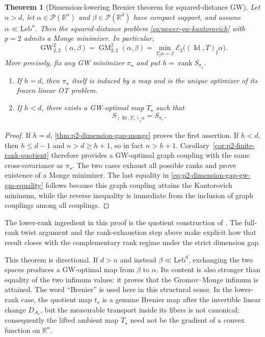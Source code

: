 \documentclass[11pt,a4paper]{article}
\newtheorem{theorem}{Theorem}[section]
\theoremstyle{definition}
\theoremstyle{remark}
\newcommand{\R}{\mathbb R}
\newcommand{\Pcal}{\mathcal P}
\newcommand{\Ecal}{\mathcal E}
\newcommand{\Id}{\operatorname{Id}}
\newcommand{\rank}{\operatorname{rank}}
\newcommand{\GW}{\operatorname{GW}}
\newcommand{\GM}{\operatorname{GM}}
\begin{document}
\begin{theorem}[Dimension-lowering Brenier theorem for squared-distance GW]
\label{thm:p2-strict-dimension-gap-monge}
Let \(n>d\), let \(\alpha\in\Pcal(\R^n)\) and
\(\beta\in\Pcal(\R^d)\) have compact support, and assume
\(\alpha\ll\mathrm{Leb}^n\).  Then the squared-distance problem
\eqref{eq:power-gw-kantorovich} with \(p=2\) admits a Monge minimizer.  In
particular,
\begin{equation}
  \GW_{2,2}^2(\alpha,\beta)
  =\GM_{2,2}^2(\alpha,\beta)
  =\min_{T_\sharp\alpha=\beta}
    \Ecal_2\bigl((\Id,T)_\sharp\alpha\bigr).
  \label{eq:p2-dimension-gap-gw-gm-equality}
\end{equation}
More precisely, fix any GW minimizer \(\pi_\star\) and put
\(h=\rank S_{\pi_\star}\).
\begin{enumerate}[label=(\roman*)]
  \item If \(h=d\), then \(\pi_\star\) itself is induced by a map and is the
  unique optimizer of its frozen linear OT problem.
  \item If \(h<d\), there exists a GW-optimal map \(T_\star\) such that
  \begin{equation}
    S_{(\Id,T_\star)_\sharp\alpha}=S_{\pi_\star}.
    \label{eq:p2-dimension-gap-preserved-cross-covariance}
  \end{equation}
\end{enumerate}
\end{theorem}

\begin{proof}
If \(h=d\), \cref{thm:p2-dimension-gap-monge} proves the first assertion.
If \(h<d\), then \(h\leq d-1\) and \(n>d\geq h+1\), so in fact
\(n>h+1\).  Corollary~\ref{cor:p2-finite-rank-quotient} therefore provides a
GW-optimal graph coupling with the same cross-covariance as \(\pi_\star\).
The two cases exhaust all possible ranks and prove existence of a Monge
minimizer.  The last equality in
\eqref{eq:p2-dimension-gap-gw-gm-equality} follows because this graph coupling
attains the Kantorovich minimum, while the reverse inequality is immediate
from the inclusion of graph couplings among all couplings.
\end{proof}

The lower-rank ingredient in this proof is the quotient construction of
\citet{DumontLacombeVialard2025}.  The full-rank twist argument and the
rank-exhaustion step above make explicit how that result closes with the
complementary rank regime under the strict dimension gap.

This theorem is directional.  If \(d>n\) and instead
\(\beta\ll\mathrm{Leb}^d\), exchanging the two spaces produces a GW-optimal
map from \(\beta\) to \(\alpha\).  Its content is also stronger than equality
of the two infimum values: it proves that the Gromov--Monge infimum is
attained.  The word ``Brenier'' is used here in this structural sense.  In the
lower-rank case, the quotient map \(t_\star\) is a genuine Brenier map after
the invertible linear change \(D_{A_\star}\), but the measurable transport
inside its fibers is not canonical; consequently the lifted ambient map
\(T_\star\) need not be the gradient of a convex function on \(\R^n\).
\end{document}
